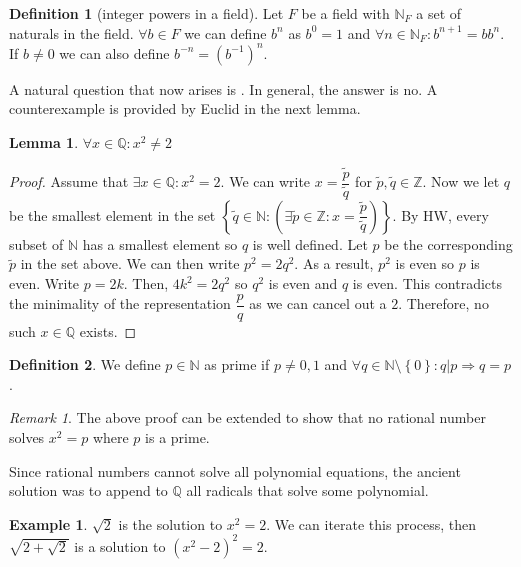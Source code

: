 \documentclass{article}
\newcommand\N{\ensuremath{\mathbb{N}}}
\newcommand\Z{\ensuremath{\mathbb{Z}}}
\newcommand\Q{\ensuremath{\mathbb{Q}}}
\newtheorem{lemma}[theorem]{Lemma}
\theoremstyle{definition}
\newtheorem{definition}{Definition}[subsection]
\newtheorem{eg}{Example}[subsection]
\theoremstyle{remark}
\newtheorem*{remark}{Remark}
\theoremstyle{plain}
\begin{document}
\begin{definition}[integer powers in a field]
    Let \(F\) be a field with \(\N_F\) a set of naturals in the field. \(\forall b \in F\) we can define 
    \(b^n\) as \(b^0 = 1\) and \(\forall n \in \N_F: b^{n+1} = bb^n\). If \(b \neq 0\) we can also define \(b^{-n} = (b^{-1})^n\).
\end{definition}

A natural question that now arises is . In general, the answer is no. 
A counterexample is provided by Euclid in the next lemma. 

\begin{lemma}
    \(\forall x \in \Q: x^2 \neq 2\)
\end{lemma}
\begin{proof}
    Assume that \(\exists x \in \Q: x^2 = 2\). We can write \(x = \dfrac{\tilde{p}}{\tilde{q}}\) for \(\tilde{p}, \tilde{q} \in \Z\).
    Now we let \(q\) be the smallest element in the set \(\left\{ \tilde{q} \in \N : (\exists \tilde{p} \in \Z: x = \dfrac{\tilde{p}}{\tilde{q}}) \right\}\).
    By HW, every subset of \(\N\) has a smallest element so \(q\) is well defined. Let \(p\) be the corresponding \(\tilde{p}\) in the set above. We can then write
    \(p^2 = 2q^2\). As a result, \(p^2\) is even so \(p\) is even. Write \(p = 2k\). Then, \(4k^2 = 2q^2\) so \(q^2\) is even and \(q\) is even. This contradicts the
    minimality of the representation \(\dfrac{p}{q}\) as we can cancel out a \(2\). Therefore, no such \(x \in \Q\) exists.
\end{proof}

\begin{definition}
    We define \(p \in \N\) as prime if \(p \neq 0,1\) and \(\forall q \in \N\setminus\left\{ 0 \right\}: q|p \Rightarrow q=p\).
\end{definition}

\begin{remark}
    The above proof can be extended to show that no rational number solves \(x^2 = p\) where \(p\) is a prime.
\end{remark}

Since rational numbers cannot solve all polynomial equations, the ancient solution was to append to \(\Q\) all radicals that solve
some polynomial.

\begin{eg}
    \(\sqrt{2}\) is the solution to \(x^2 = 2\). We can iterate this process, then \(\sqrt{2+ \sqrt{2}}\) is a solution to \((x^2-2)^2 = 2\).
\end{eg}
\end{document}
